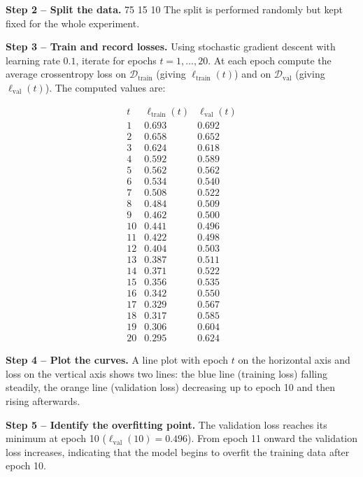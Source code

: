 \documentclass[12pt, a4paper]{article}
\begin{document}
\textbf{Step 2 -- Split the data.}  
75 %
15 %
10 %
The split is performed randomly but kept fixed for the whole experiment.

\textbf{Step 3 -- Train and record losses.}  
Using stochastic gradient descent with learning rate \(0.1\), iterate for epochs \(t=1,\dots,20\).  
At each epoch compute the average crossentropy loss on \(\mathcal{D}_{\text{train}}\) (giving \(\ell_{\text{train}}(t)\)) and on \(\mathcal{D}_{\text{val}}\) (giving \(\ell_{\text{val}}(t)\)).  
The computed values are:

\[
\begin{array}{c|c|c}
t & \ell_{\text{train}}(t) & \ell_{\text{val}}(t)\\ \hline
1 & 0.693 & 0.692\\
2 & 0.658 & 0.652\\
3 & 0.624 & 0.618\\
4 & 0.592 & 0.589\\
5 & 0.562 & 0.562\\
6 & 0.534 & 0.540\\
7 & 0.508 & 0.522\\
8 & 0.484 & 0.509\\
9 & 0.462 & 0.500\\
10& 0.441 & 0.496\\
11& 0.422 & 0.498\\
12& 0.404 & 0.503\\
13& 0.387 & 0.511\\
14& 0.371 & 0.522\\
15& 0.356 & 0.535\\
16& 0.342 & 0.550\\
17& 0.329 & 0.567\\
18& 0.317 & 0.585\\
19& 0.306 & 0.604\\
20& 0.295 & 0.624
\end{array}
\]

\textbf{Step 4 -- Plot the curves.}  
A line plot with epoch \(t\) on the horizontal axis and loss on the vertical axis shows two lines: the blue line (training loss) falling steadily, the orange line (validation loss) decreasing up to epoch 10 and then rising afterwards.

\textbf{Step 5 -- Identify the overfitting point.}  
The validation loss reaches its minimum at epoch 10 (\(\ell_{\text{val}}(10)=0.496\)).  
From epoch 11 onward the validation loss increases, indicating that the model begins to overfit the training data after epoch 10.
\end{document}
